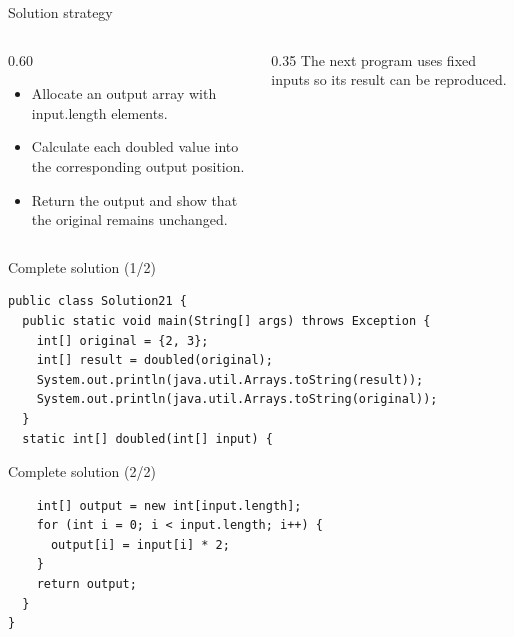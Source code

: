 \documentclass[10pt,aspectratio=169]{beamer}
\begin{document}
\begin{frame}[fragile,t]{Solution strategy}
\begin{columns}[T,onlytextwidth]\begin{column}{0.60\textwidth}
\begin{itemize}
\item Allocate an output array with input.length elements.
\item Calculate each doubled value into the corresponding output position.
\item Return the output and show that the original remains unchanged.
\end{itemize}
\end{column}\begin{column}{0.35\textwidth}\small
The next program uses fixed inputs so its result can be reproduced.
\end{column}\end{columns}
\end{frame}

\begin{frame}[fragile,t]{Complete solution (1/2)}
\begin{lstlisting}
public class Solution21 {
  public static void main(String[] args) throws Exception {
    int[] original = {2, 3};
    int[] result = doubled(original);
    System.out.println(java.util.Arrays.toString(result));
    System.out.println(java.util.Arrays.toString(original));
  }
  static int[] doubled(int[] input) {
\end{lstlisting}
\end{frame}

\begin{frame}[fragile,t]{Complete solution (2/2)}
\begin{lstlisting}
    int[] output = new int[input.length];
    for (int i = 0; i < input.length; i++) {
      output[i] = input[i] * 2;
    }
    return output;
  }
}
\end{lstlisting}
\end{frame}
\end{document}
